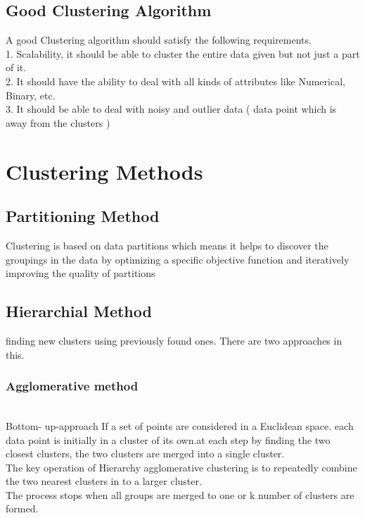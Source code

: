 \documentclass[11pt]{article}
\begin{document}
\subsection{Good Clustering Algorithm}
A good Clustering algorithm should satisfy the following requirements.\\
1. Scalability, it should be able to cluster the entire data given but not just a part of it.\\
2. It should have the ability to deal with all kinds of attributes like Numerical, Binary, etc.\\
3. It should be able to deal with noisy and outlier data ( data point which is away from the clusters )\\

\section{Clustering Methods}

\subsection{Partitioning Method}
Clustering is based on data partitions which means it helps to discover the groupings in the data by optimizing a specific objective function and iteratively improving the quality of partitions\\
\subsection{Hierarchial Method}
finding new clusters using previously found ones. There are two approaches in this.\\
\subsubsection{Agglomerative method }\\
Bottom- up-approach
If a set of points are considered in a Euclidean space. each data point is initially  in a cluster of its own.at each step by finding the two closest clusters, the two clusters are merged into a single cluster.\\
The key operation of Hierarchy agglomerative clustering is to repeatedly combine the two nearest clusters in to a larger cluster.\\
The process stops when all groups are merged to one or k number of clusters are formed.\\
\end{document}

